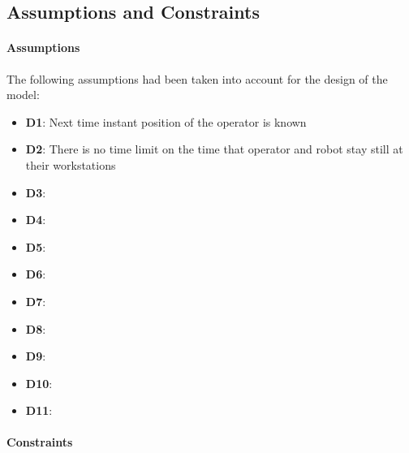 \subsection{Assumptions and Constraints}

\paragraph{Assumptions}
\newcommand{\DI}{\textbf{D1}: Next time instant position of the operator is known}
\newcommand{\DII}{\textbf{D2}: There is no time limit on the time that operator and robot stay still at their workstations}
\newcommand{\DIII}{\textbf{D3}: }
\newcommand{\DIV}{\textbf{D4}: }
\newcommand{\DV}{\textbf{D5}: }
\newcommand{\DVI}{\textbf{D6}: }
\newcommand{\DVII}{\textbf{D7}: }
\newcommand{\DVIII}{\textbf{D8}: }
\newcommand{\DIX}{\textbf{D9}: }
\newcommand{\DX}{\textbf{D10}: }
\newcommand{\DXI}{\textbf{D11}: }

The following assumptions had been taken into account for the design of the model:
\newline\begin{itemize}
	\item  \DI
	\item  \DII
	\item  \DIII
	\item  \DIV
	\item  \DV
	\item  \DVI
	\item  \DVII
	\item  \DVIII
	\item  \DIX
	\item  \DX
	\item  \DXI
\end{itemize}

\paragraph{Constraints}

